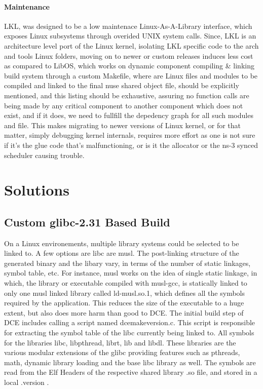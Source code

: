 \documentclass{sig-alternate}
\begin{document}
\paragraph{Maintenance}
LKL, was designed to be a low maintenace Linux-As-A-Library interface, which exposes Linux subsystems through overided UNIX system calls. 
Since, LKL is an architecture level port of the Linux kernel, isolating LKL specific code to the arch and tools Linux folders, moving on to 
newer or custom releases induces less cost as compared to LibOS, which works on dynamic component compiling \& linking build system through a
custom Makefile, where are Linux files and modules to be compiled and linked to the final nuse shared object file, should be explicitly mentioned,
and this listing should be exhaustive, assuring no function calls are being made by any critical component to another component which does not 
exist, and if it does, we need to fullfill the depedency graph for all such modules and file. This makes migrating to newer versions of Linux kernel,
or for that matter, simply debugging kernel internals, requires more effort as one is not sure if it's the glue code that's malfunctioning, or is it
the allocator or the ns-3 synced scheduler causing trouble.

\section{Solutions}
\label{section:design}

\subsection{Custom glibc-2.31 Based Build}
On a Linux environements, multiple library systems could be selected to be linked to. A few options are libc are musl. The post-linking structure
of the generated binary and the libary vary, in terms of the number of static linkages, symbol table, etc. For instance, musl works on the idea of
single static linkage, in which, the library or executable compiled with musl-gcc, is statically linked to only one musl linked library called 
ld-musl.so.1, which defines all the symbols required by the application. This reduces the size of the executable to a huge extent, but 
also does more harm than good to DCE. The initial build step of DCE includes calling a script named dcemakeversion.c. This script is responsible 
for extracting the symbol table of the libc currently being linked to. All symbols for the libraries libc, libpthread, librt, lib and libdl. These 
libraries are the various modular extensions of the glibc providing features such as pthreads, math, dynamic library loading and the base libc 
library as well. The symbols are read from the Elf Headers of the respective shared library .so file, and stored in a local .version .
\end{document}
